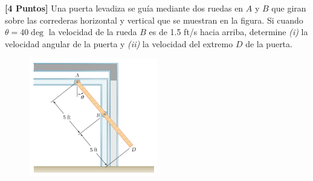 \documentclass[ a4paper, twoside, 11pt]{article}
\begin{document}
\fullskip

\begin{problem}
\textbf{[4 Puntos]} Una puerta levadiza se gu\'ia mediante dos ruedas en $A$ y $B$ que giran sobre las correderas horizontal y vertical que se muestran en la figura. Si cuando $\theta = 40\deg$ la velocidad de la rueda $B$ es de 1.5 ft/s hacia arriba, determine \textit{(i)} la velocidad angular de la puerta y \textit{(ii)} la velocidad del extremo $D$ de la puerta. 

\begin{figure}[H]
\centering
\includegraphics[width=0.5\textwidth]{problema-2.jpg}
\end{figure}


\end{problem}
\end{document}
